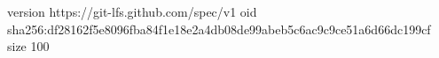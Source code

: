 version https://git-lfs.github.com/spec/v1
oid sha256:df28162f5e8096fba84f1e18e2a4db08de99abeb5c6ac9c9ce51a6d66dc199cf
size 100
